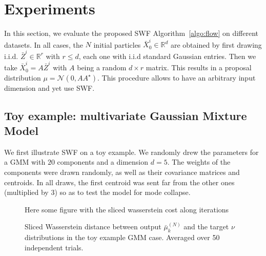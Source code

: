 
\section{Experiments}

In this section, we evaluate the proposed SWF Algorithm~\ref{algo:flow} on different datasets. In all cases, the $N$ initial particles $\bar{X}^i_0\in\mathbb{R}^d$ are obtained by first drawing i.i.d. $\bar{Z}^i\in\mathbb{R}^r$ with $r\leq d$, each one with i.i.d standard Gaussian entries. Then we take $\bar{X}^i_0=A\bar{Z}^i$ with $A$ being a random $d\times r$ matrix. This results in a proposal distribution $\mu=\mathcal{N}(0,AA^\star)$. This procedure allows to have an arbitrary input dimension and yet use SWF.

\subsection{Toy example: multivariate Gaussian Mixture Model}
\label{sub:toy_example}

We first illustrate SWF on a toy example. We randomly drew the parameters for a GMM with $20$ components and a dimension $d=5$. The weights of the components were drawn randomly, as well as their covariance matrices and centroids. In all draws, the first centroid was sent far from the other ones (multiplied by $3$) so as to test the model for mode collapse.

\begin{figure}
\begin{centering}
  Here some figure with the sliced wasserstein cost along iterations
\par\end{centering}
\caption{Sliced Wasserstein distance between output $\bar{\mu}_{k}^{(N)}$ and the target $\nu$ distributions in the toy example GMM case. Averaged over 50 independent trials.\label{fig:toy_sw}}
\end{figure}


